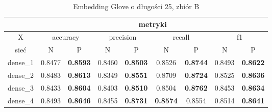 \begin{table}[h] \centering
    \caption{Embedding Glove o długości 25, zbiór B}
    \label{tab:wyniki_glove_B}
    \begin{tabular} {|c|c|c|c|c|c|c|c|c| }    \hline
                 & \multicolumn{8}{c|}{metryki}                                                                                                                                                                                                                                                                             \\ \hline
        X        & \multicolumn{2}{c|}{accuracy}       & \multicolumn{2}{c|}{precision}      & \multicolumn{2}{c|}{recall}         & \multicolumn{2}{c|}{f1}                                                                                                                                                                \\ \hline
        sieć     & N                                   & P                                   & N                                   & P                              & N                                   & P                                   & N                                   & P                                   \\ \hline
        dense\_1 & 0.8477                              & \textbf{0.8593}                     & 0.8460                              & \textbf{0.8503}                & 0.8526                              & \textbf{0.8744}                     & 0.8493                              & \textbf{0.8622}                     \\ \hline
        dense\_2 & 0.8483                              & \textbf{0.8613}                     & 0.8349                              & \textbf{0.8551}                & 0.8709                              & \textbf{0.8724}                     & 0.8525                              & \textbf{0.8636}                     \\ \hline
        dense\_3 & 0.8433                              & \textbf{0.8604}                     & 0.8403                              & \textbf{0.8510}                & 0.8504                              & \textbf{0.8762}                     & 0.8453                              & \textbf{0.8634}                     \\ \hline
        dense\_4 & 0.8493                              & \textbf{0.8646}                     & 0.8455                              & \textbf{0.8731}                & \textbf{0.8574}                     & 0.8554                              & 0.8514                              & \textbf{0.8641}                     \\ \hline

\end{tabular}
\end{table}
